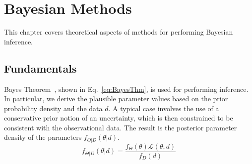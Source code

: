\chapter{Bayesian Methods}\label{uq:bayes}


This chapter covers theoretical aspects of methods for performing
Bayesian inference.

\section{Fundamentals} \label{uq:bayes:basic}

Bayes Theorem~\cite{Jaynes}, shown in Eq.~\ref{eq:BayesThm}, is used
for performing inference.  In particular, we derive the plausible
parameter values based on the prior probability density and the data
$d$. A typical case involves the use of a conservative prior notion of
an uncertainty, which is then constrained to be consistent with the
observational data.  The result is the posterior parameter density of
the parameters $f_{\Theta |D}\left( {\theta |d} \right)$.
\begin{equation}
{f_{\Theta |D}}\left( {\theta |d} \right) = \frac{{{f_\Theta }\left( \theta  \right)\mathcal{L}\left( {\theta ;d} \right)}}{{{f_D}\left( d \right)}} \label{eq:BayesThm}
\end{equation}

